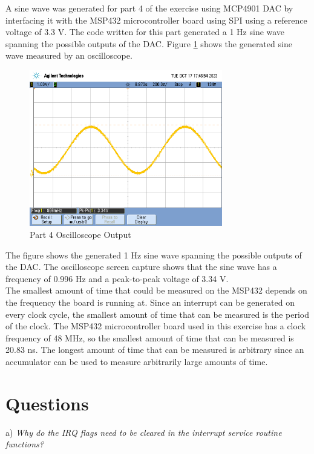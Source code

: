 \documentclass[CMPE]{KGCOEReport}
\begin{document}
A sine wave was generated for part 4 of the exercise using MCP4901 DAC by interfacing it with the MSP432 microcontroller board using SPI using a reference voltage of 3.3 V. The code written for this part generated a 1 Hz sine wave spanning the possible outputs of the DAC. Figure \ref{fig:part4} shows the generated sine wave measured by an oscilloscope.

\begin{figure}[H]
    \centering
    \includegraphics[width=0.75\textwidth]{part4.png}
    \caption{Part 4 Oscilloscope Output}
    \label{fig:part4}
\end{figure}

The figure shows the generated 1 Hz sine wave spanning the possible outputs of the DAC. The oscilloscope screen capture shows that the sine wave has a frequency of 0.996 Hz and a peak-to-peak voltage of 3.34 V.\\

The smallest amount of time that could be measured on the MSP432 depends on the frequency the board is running at. Since an interrupt can be generated on every clock cycle, the smallest amount of time that can be measured is the period of the clock. The MSP432 microcontroller board used in this exercise has a clock frequency of 48 MHz, so the smallest amount of time that can be measured is 20.83 ns. The longest amount of time that can be measured is arbitrary since an accumulator can be used to measure arbitrarily large amounts of time.\\


\section*{Questions}

a) \emph{Why do the IRQ flags need to be cleared in the interrupt service routine functions?}
\end{document}
